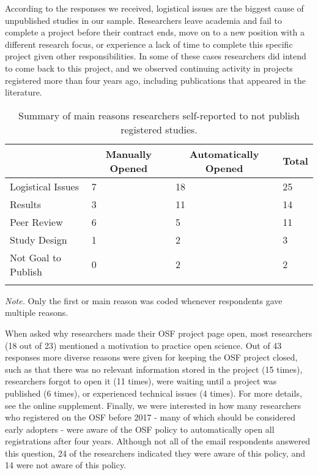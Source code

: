 \documentclass[
  ,jou, a4paper,floatsintext]{apa6}
\begin{document}
According to the responses we received, logistical issues are the biggest cause of unpublished studies in our sample. Researchers leave academia and fail to complete a project before their contract ends, move on to a new position with a different research focus, or experience a lack of time to complete this specific project given other responsibilities. In some of these cases researchers did intend to come back to this project, and we observed continuing activity in projects registered more than four years ago, including publications that appeared in the literature.

\begin{table*}[tbp]

\begin{center}
\begin{threeparttable}

\caption{\label{tab:table-reasons}Summary of main reasons researchers self-reported to not publish registered studies.}

\begin{tabular}{llll}
\toprule
 & \multicolumn{1}{c}{Manually Opened} & \multicolumn{1}{c}{Automatically Opened} & \multicolumn{1}{c}{Total}\\
\midrule
Logistical Issues & 7 & 18 & 25\\
Results & 3 & 11 & 14\\
Peer Review & 6 & 5 & 11\\
Study Design & 1 & 2 & 3\\
Not Goal to Publish & 0 & 2 & 2\\
\bottomrule
\addlinespace
\end{tabular}

\begin{tablenotes}[para]
\normalsize{\textit{Note.} Only the first or main reason was coded whenever respondents gave multiple reasons.}
\end{tablenotes}

\end{threeparttable}
\end{center}

\end{table*}

When asked why researchers made their OSF project page open, most researchers (18 out of 23) mentioned a motivation to practice open science. Out of 43 responses more diverse reasons were given for keeping the OSF project closed, such as that there was no relevant information stored in the project (15 times), researchers forgot to open it (11 times), were waiting until a project was published (6 times), or experienced technical issues (4 times). For more details, see the online supplement. Finally, we were interested in how many researchers who registered on the OSF before 2017 - many of which should be considered early adopters - were aware of the OSF policy to automatically open all registrations after four years. Although not all of the email respondents answered this question, 24 of the researchers indicated they were aware of this policy, and 14 were not aware of this policy.
\end{document}
